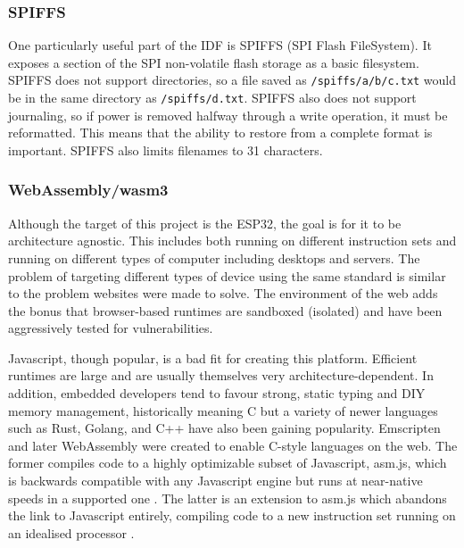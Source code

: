 \documentclass{article}
\begin{document}
\subsubsection{SPIFFS}

One particularly useful part of the IDF is SPIFFS (SPI Flash FileSystem).
It exposes a section of the SPI non-volatile flash storage as a basic filesystem.
SPIFFS does not support directories, so a file saved as \texttt{/spiffs/a/b/c.txt} would be in the same directory as \texttt{/spiffs/d.txt}.
SPIFFS also does not support journaling, so if power is removed halfway through a write operation, it must be reformatted.
This means that the ability to restore from a complete format is important.
SPIFFS also limits filenames to 31 characters.

\subsubsection{WebAssembly/wasm3}

Although the target of this project is the ESP32, the goal is for it to be architecture agnostic.
This includes both running on different instruction sets and running on different types of computer including desktops and servers.
The problem of targeting different types of device using the same standard is similar to the problem websites were made to solve.
The environment of the web adds the bonus that browser-based runtimes are sandboxed (isolated) and have been aggressively tested for vulnerabilities.

Javascript, though popular, is a bad fit for creating this platform.
Efficient runtimes are large and are usually themselves very architecture-dependent.
In addition, embedded developers tend to favour strong, static typing and DIY memory management, historically meaning C but a variety of newer languages such as Rust, Golang, and C++ have also been gaining popularity.
Emscripten and later WebAssembly were created to enable C-style languages on the web.
The former compiles code to a highly optimizable subset of Javascript, asm.js, which is backwards compatible with any Javascript engine but runs at near-native speeds in a supported one \cite{asm}.
The latter is an extension to asm.js which abandons the link to Javascript entirely, compiling code to a new instruction set running on an idealised processor \cite{wasm}.
\end{document}
